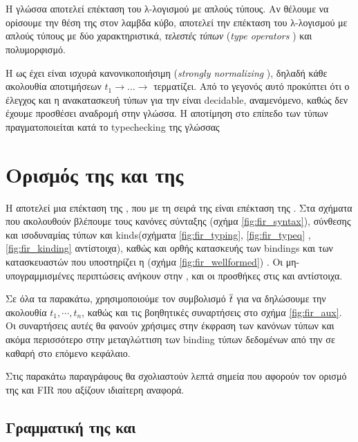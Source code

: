 \section{\FOM} \label{sec:fom}

Η γλώσσα \FOM{} αποτελεί επέκταση του λ-λογισμού με απλούς τύπους. Αν θέλουμε
να ορίσουμε την θέση της στον λαμβδα κύβο, αποτελεί την επέκταση του
λ-λογισμού με απλούς τύπους με δύο χαρακτηριστικά, \emph{τελεστές τύπων}
(\emph{type operators} ) και πολυμορφισμό.

Η \FOM{} ως έχει είναι ισχυρά κανονικοποιήσιμη (\emph{strongly normalizing} ),
δηλαδή κάθε ακολουθία αποτιμήσεων $t_1 \rightarrow \dots \rightarrow $
τερματίζει. Από το  γεγονός αυτό προκύπτει ότι ο έλεγχος και η ανακατασκευή
τύπων για την \FOM{} είναι decidable, αναμενόμενο, καθώς δεν έχουμε προσθέσει
αναδρομή στην γλώσσα.  Η αποτίμηση στο επίπεδο των τύπων πραγματοποιείται κατά
το typechecking της γλώσσας

\section{Ορισμός της \FOMF{} και της \FIR{}} \label{sec:fomf}


Η \FIR{} αποτελεί μια επέκταση της \FOMF{}, που με τη σειρά της είναι επέκταση
της \FOM{}.  Στα σχήματα που ακολουθούν βλέπουμε τους κανόνες σύνταξης (σχήμα
\ref{fig:fir_syntax}), σύνθεσης και ισοδυναμίας τύπων και kinds(σχήματα
\ref{fig:fir_typing}, \ref{fig:fir_typeq} , \ref{fig:fir_kinding} αντίστοιχα),
καθώς και ορθής κατασκευής των bindings και των κατασκευαστών που υποστηρίζει η
\FIR{} (σχήμα \ref{fig:fir_wellformed}) . Οι μη-υπογραμμισμένες περιπτώσεις
ανήκουν στην \FOM{}, και οι προσθήκες στις \fomfDiff{\FOMF{}} και
\firDiff{\FIR{}} αντίστοιχα.

Σε όλα τα παρακάτω, χρησιμοποιούμε τον συμβολισμό $\overline{t}$ για να δηλώσουμε
την ακολουθία $t_1, \cdots, t_n$, καθώς και τις βοηθητικές συναρτήσεις στο
σχήμα \ref{fig:fir_aux}. Οι συναρτήσεις αυτές θα φανούν χρήσιμες στην έκφραση
των κανόνων τύπων και ακόμα περισσότερο στην μεταγλώττιση των binding τύπων
δεδομένων από την \FIR{} σε καθαρή \FOMF{} στο επόμενο κεφάλαιο.

Στις παρακάτω παραγράφους θα σχολιαστούν λεπτά σημεία που αφορούν τον ορισμό
της \FOMF{} και FIR{} που αξίζουν ιδιαίτερη αναφορά.


\subsection{Γραμματική της \FOMF{} και \FIR{} } \label{subsec:grammar}


